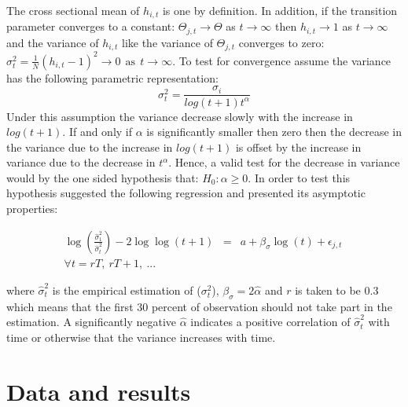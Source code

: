 \documentclass[]{amsart}
\begin{document}
The cross sectional mean of $h_{i,t}$ is one by definition. In addition, if the transition parameter converges to a constant: $\Theta_{j,t} \rightarrow \Theta$ as $t \rightarrow \infty$ then $h_{i,t} \rightarrow 1$ as $t \rightarrow \infty$ and the variance of $h_{i,t}$ like the variance of $\Theta_{j,t}$ converges to zero:  $ \sigma_t^2 = \frac{1}{N}(h_{i,t}-1)^2 \rightarrow 0   \ \ \text{as} \ \ t \rightarrow \infty $. To test for convergence \cite{PhillipsSul2007} assume the variance has the following parametric representation: $$\sigma_t^2=\frac{\sigma_i}{log(t+1)t^{\alpha}}$$Under this assumption the variance decrease slowly with the increase in $log(t+1)$. If and only if $\alpha$ is significantly smaller then zero then the decrease in the variance due to the increase in $log(t+1)$ is offset by the increase in variance due to the decrease in $t^\alpha$. Hence, a valid test for the decrease in variance would by the one sided hypothesis that: $H_0: \alpha \geq 0$. In order to test this hypothesis \cite{PhillipsSul2007} suggested the following regression and presented its asymptotic properties:

\begin{eqnarray}
\log{ \left( \frac{\hat \sigma_1^2}{\hat \sigma_t^2} \right)} - 2\log{ \log{(t+1)}} &=& a + \beta_{\sigma} \log{(t)}+\epsilon_{j,t} \  \\
\forall t=rT, \ rT+1, \ ...
\nonumber
\label{var_PS}
\end{eqnarray}

where $\hat \sigma_t^2$ is the empirical estimation of ($\sigma_t^2$), $\beta_{\sigma}=2\hat{\alpha}$ and $r$ is taken to be 0.3 which means that the first 30 percent of observation should not take part in the estimation. A significantly negative $\hat{\alpha}$ indicates a positive correlation of $\hat \sigma_t^2$ with time or otherwise that the variance increases with time.

\section{Data and results}
\end{document}
